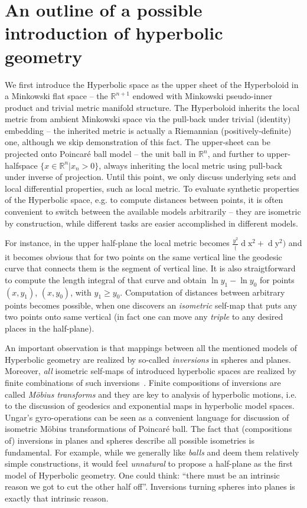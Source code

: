 \section{An outline of a possible introduction of hyperbolic geometry}

We first introduce the Hyperbolic space as the upper sheet of the Hyperboloid in
a Minkowski flat space -- the \( \mathbb{R}^{n+1} \) endowed with Minkowski
pseudo-inner product and trivial metric manifold structure.
The Hyperboloid inherits the local metric from ambient Minkowski space via the
pull-back under trivial (identity) embedding -- the inherited metric is
actually a Riemannian (positively-definite) one, although we skip demonstration
of this fact.
The upper-sheet can be projected onto Poincar\'e ball model -- the unit ball in
\( \mathbb{R}^n \), and further to upper-halfspace
\( \{x\in\mathbb{R}^n\left|x_n > 0 \right. \} \), always inheriting the local
metric using pull-back under inverse of projection.  Until this point, we only
discuss underlying sets and local differential properties, such as local
metric. To evaluate synthetic properties of the Hyperbolic space, e.g. to
compute distances between points, it is often convenient to switch between the
available models arbitrarily -- they are isometric by construction, while
different tasks are easier accomplished in different models.

For instance, in the upper half-plane the local metric becomes \(
\frac{y^2}(\operatorname{d}\mathrm{x}^2 + \operatorname{d}\mathrm{y}^2) \) and
it becomes obvious that for two points on the same vertical line the geodesic
curve that connects them is the segment of vertical line.  It is also
straigtforward to compute the length integral of that curve and obtain \( \ln
y_1 - \ln y_0 \) for points \( (x, y_1) \), \( (x, y_0) \), with \( y_1 \geq
y_0 \). Computation of distances between arbitrary points becomes possible,
when one discovers an \emph{isometric} self-map that puts any two points onto
same vertical (in fact one can move any \emph{triple} to any desired places in
the half-plane).

An important observation is that mappings between all the mentioned models of
Hyperbolic geometry are realized by so-called \emph{inversions} in spheres and
planes. Moreover, \emph{all} isometric self-maps of introduced hyperbolic
spaces are realized by finite combinations of such
inversions~\cite{beardonMindaHyp,beardonGeometryDiscrete,visualComplexAn}.
Finite compositions
of inversions are called \emph{M\"obius transforms} and they are key to
analysis of hyperbolic motions, i.e. to the discussion of geodesics and
exponential maps in hyperbolic model spaces. Ungar's gyro-operations
can be seen as a convenient language for discussion of isometric M\"obius
transformations of Poincar\'e ball.  The fact that (compositions of) inversions in planes and
spheres describe all possible isometries is fundamental. For example, while we
generally like \emph{balls} and deem them relatively simple constructions, it
would feel \emph{unnatural} to propose a half-plane as the first model of
Hyperbolic geometry. One could think: ``there must be an intrinsic reason we
got to cut the other half off''. Inversions turning spheres into planes is
exactly that intrinsic reason.

